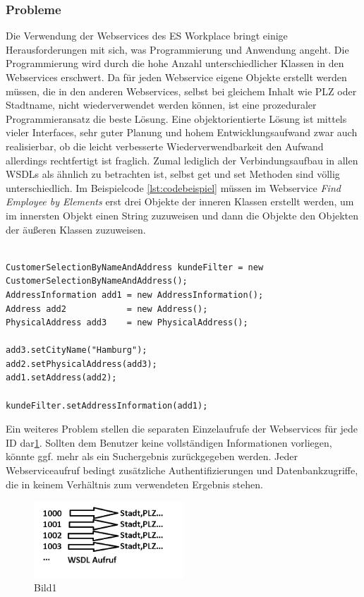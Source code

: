 \subsubsection{Probleme}

Die Verwendung der Webservices des ES Workplace bringt einige Herausforderungen mit sich, was Programmierung und Anwendung
angeht. Die Programmierung wird durch die hohe Anzahl unterschiedlicher Klassen in den Webservices erschwert. Da für jeden
Webservice eigene Objekte erstellt werden müssen, die in den anderen Webservices, selbst bei gleichem Inhalt wie PLZ oder
Stadtname, nicht wiederverwendet werden können, ist eine prozeduraler Programmieransatz die beste Lösung. Eine objektorientierte 
Lösung ist mittels vieler Interfaces, sehr guter Planung und hohem Entwicklungsaufwand zwar auch realisierbar, ob die leicht 
verbesserte Wiederverwendbarkeit den Aufwand allerdings rechtfertigt ist fraglich. Zumal lediglich der Verbindungsaufbau in allen
WSDLs als ähnlich zu betrachten ist, selbst get und set Methoden sind völlig unterschiedlich. Im Beispielcode \ref{lst:codebeispiel}
müssen im Webservice \emph{Find Employee by Elements} erst drei Objekte der inneren Klassen erstellt werden, um im  innersten Objekt 
einen String zuzuweisen und dann die Objekte den Objekten der äußeren Klassen zuzuweisen.

\begin{lstlisting}[float=h!t]

CustomerSelectionByNameAndAddress kundeFilter = new CustomerSelectionByNameAndAddress();
AddressInformation add1 = new AddressInformation();
Address add2            = new Address();
PhysicalAddress add3    = new PhysicalAddress();

add3.setCityName("Hamburg");
add2.setPhysicalAddress(add3);
add1.setAddress(add2);

kundeFilter.setAddressInformation(add1);

\end{lstlisting} 


Ein weiteres Problem stellen die separaten Einzelaufrufe der Webservices für jede ID dar\ref{fig:sapbild1}. Sollten dem Benutzer keine
vollständigen Informationen vorliegen, könnte ggf. mehr als ein Suchergebnis zurückgegeben werden. Jeder Webserviceaufruf bedingt 
zusätzliche Authentifizierungen und Datenbankzugriffe, die in keinem Verhältnis zum verwendeten Ergebnis stehen.
\begin{figure}[h!t]
\begin{center}
\includegraphics[width=0.5\textwidth]{Bilder/presi1.png}
\end{center}
\caption{Bild1}
\label{fig:sapbild1} 
\end{figure}


